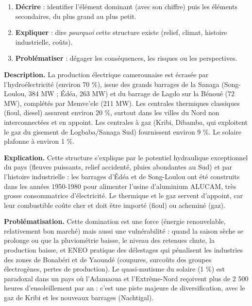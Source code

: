 \documentclass[11pt]{article}
\newcommand{\cle}[1]{{\popxbold\color{popdark}#1}}
\begin{document}
\begin{methode}
\begin{enumerate}
\item \textbf{Décrire} : identifier l'élément dominant (avec son chiffre) puis les éléments secondaires, du plus grand au plus petit.
\item \textbf{Expliquer} : dire \emph{pourquoi} cette structure existe (relief, climat, histoire industrielle, coûts).
\item \textbf{Problématiser} : dégager les conséquences, les risques ou les perspectives.
\end{enumerate}
\end{methode}

\textbf{Description.} La production électrique camerounaise est écrasée par l'\cle{hydroélectricité} (environ 70 \%), issue des grands barrages de la Sanaga (Song-Loulou, 384 MW ; Édéa, 263 MW) et du barrage de Lagdo sur la Bénoué (72 MW), complétés par Memve'ele (211 MW). Les centrales thermiques classiques (fioul, diesel) assurent environ 20 \%, surtout dans les villes du Nord non interconnectées et en appoint. Les centrales à gaz (Kribi, Dibamba, qui exploitent le gaz du gisement de Logbaba/Sanaga Sud) fournissent environ 9 \%. Le solaire plafonne à environ 1 \%.

\textbf{Explication.} Cette structure s'explique par le potentiel hydraulique exceptionnel du pays (fleuves puissants, relief accidenté, pluies abondantes au Sud) et par l'histoire industrielle : les barrages d'Édéa et de Song-Loulou ont été construits dans les années 1950-1980 pour alimenter l'usine d'aluminium \cle{ALUCAM}, très grosse consommatrice d'électricité. Le thermique et le gaz servent d'appoint, car leur combustible coûte cher et doit être importé (fioul) ou acheminé (gaz).

\textbf{Problématisation.} Cette domination est une force (énergie renouvelable, relativement bon marché) mais aussi une \cle{vulnérabilité} : quand la saison sèche se prolonge ou que la pluviométrie baisse, le niveau des retenues chute, la production baisse, et ENEO pratique des délestages qui pénalisent les industries des zones de Bonabéri et de Yaoundé (coupures, surcoûts des groupes électrogènes, pertes de production). Le quasi-mutisme du solaire (1 \%) est paradoxal dans un pays où l'Adamaoua et l'Extrême-Nord reçoivent plus de 2 500 heures d'ensoleillement par an : c'est une piste majeure de diversification, avec le gaz de Kribi et les nouveaux barrages (Nachtigal).
\end{document}
